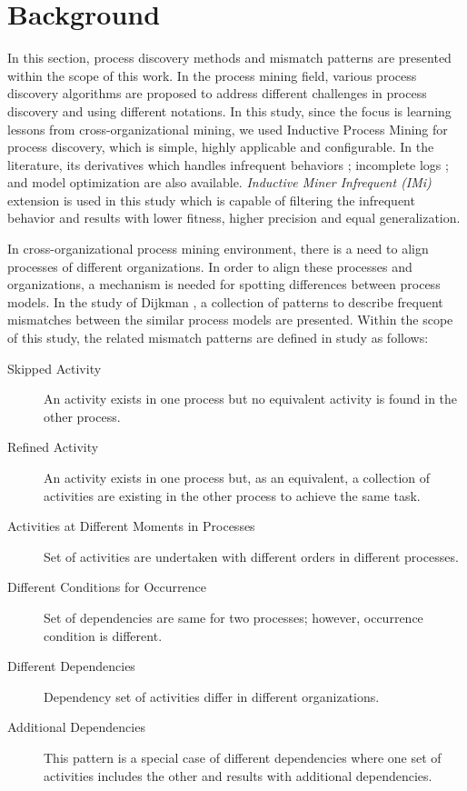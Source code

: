 \section{Background}
\label{sec:background}

In this section, process discovery methods and mismatch patterns are presented within the scope of this work. In the process mining field, various process discovery algorithms are proposed to address different challenges in process discovery and using different notations. In this study, since the focus is learning lessons from cross-organizational mining, we used Inductive Process Mining \cite{leemans2013discovering} for process discovery, which is simple, highly applicable and configurable. In the literature, its derivatives which handles infrequent behaviors \cite{leemans2014discoveringinfrequent}; incomplete logs \cite{leemans2014discoveringincomplete}; and model optimization \cite{weidlich2012profiles} are also available. \textit{Inductive Miner Infrequent (IMi)} \cite{leemans2014discoveringinfrequent} extension is used in this study which is capable of filtering the infrequent behavior and results with lower fitness, higher precision and equal generalization.

In cross-organizational process mining environment, there is a need to align processes of different organizations. In order to align these processes and organizations, a mechanism is needed for spotting differences between process models. In the study of Dijkman \cite{dijkman2007mismatch}, a collection of patterns to describe frequent mismatches between the similar process models are presented. Within the scope of this study, the related mismatch patterns are defined in study \cite{dijkman2007mismatch} as follows:
\begin{description}
  \item[Skipped Activity] An activity exists in one process but no equivalent activity is found in the other process.
  \item[Refined Activity] An activity exists in one process but, as an equivalent, a collection of activities are existing in the other process to achieve the same task.
  \item[Activities at Different Moments in Processes] Set of activities are undertaken with different orders in different processes.
  \item[Different Conditions for Occurrence] Set of dependencies are same for two processes; however, occurrence condition is different.
  \item[Different Dependencies] Dependency set of activities differ in different organizations.
  \item[Additional Dependencies] This pattern is a special case of different dependencies where one set of activities includes the other and results with additional dependencies.
\end{description}


